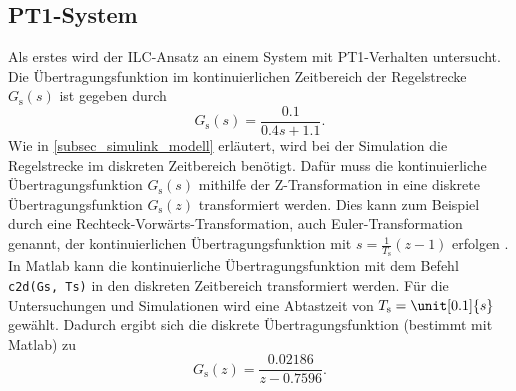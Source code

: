 \subsection{PT1-System}
Als erstes wird der ILC-Ansatz an einem System mit PT1-Verhalten untersucht. Die Übertragungsfunktion im kontinuierlichen Zeitbereich der Regelstrecke $G_\mathrm{s}(s)$ ist gegeben durch 
\begin{equation}
	\label{eq:ilc_Gs_pt1}
	G_\mathrm{s}(s) = \frac{0.1}{0.4s+1.1}.
\end{equation}
Wie in \autoref{subsec_simulink_modell} erläutert, wird bei der Simulation die Regelstrecke im diskreten Zeitbereich benötigt. Dafür muss die kontinuierliche Übertragungsfunktion $G_\mathrm{s}(s)$ mithilfe der Z-Transformation in eine diskrete Übertragungsfunktion $G_\mathrm{s}(z)$ transformiert werden. Dies kann zum Beispiel durch eine Rechteck-Vorwärts-Transformation, auch Euler-Transformation genannt, der kontinuierlichen Übertragungsfunktion mit $s = \frac{1}{T_\mathrm{s}}\left(z-1\right)$ erfolgen \cite{Skript_Baur}. In Matlab kann die kontinuierliche Übertragungsfunktion mit dem Befehl \lstinline{c2d(Gs, Ts)} in den diskreten Zeitbereich transformiert werden. Für die Untersuchungen und Simulationen wird eine Abtastzeit von $T_\mathrm{s} = \unit[0.1]{s}$ gewählt. Dadurch ergibt sich die diskrete Übertragungsfunktion (bestimmt mit Matlab) zu
\begin{equation}
	\label{eq:ilc_Gz_pt1}
	G_\mathrm{s}(z) = \frac{0.02186}{z - 0.7596}.
\end{equation}
